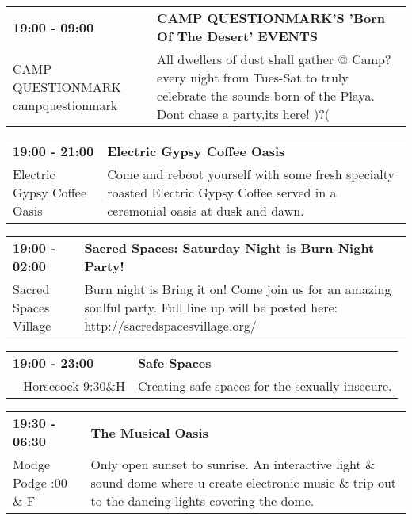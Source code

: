 \begin{tabular}{ p{1in} p{2.2in} }
    \textbf{19:00 - 09:00} & \textbf{CAMP QUESTIONMARK'S 'Born Of The Desert' EVENTS  } \\
    CAMP QUESTIONMARK \newline campquestionmark & All dwellers of dust shall gather @ Camp? every night from Tues-Sat to truly celebrate the sounds born of the Playa. Dont chase a party,its here!
)?( \\
    \hline 
\end{tabular}
    
\begin{tabular}{ p{1in} p{2.2in} }
    \textbf{19:00 - 21:00} & \textbf{Electric Gypsy Coffee Oasis} \\
    Electric Gypsy Coffee Oasis \newline  & Come and reboot yourself with some fresh specialty roasted Electric Gypsy Coffee served in a ceremonial oasis at dusk and dawn. \\
    \hline 
\end{tabular}
    
\begin{tabular}{ p{1in} p{2.2in} }
    \textbf{19:00 - 02:00} & \textbf{Sacred Spaces: Saturday Night is Burn Night Party!} \\
    Sacred Spaces Village \newline  & Burn night is Bring it on! Come join us for an amazing soulful party. Full line up will be posted here: http://sacredspacesvillage.org/ \\
    \hline 
\end{tabular}
    
\begin{tabular}{ p{1in} p{2.2in} }
    \textbf{19:00 - 23:00} & \textbf{Safe Spaces} \\
    ~ \newline Horsecock 9:30\&H & Creating safe spaces for the sexually insecure. \\
    \hline 
\end{tabular}
    
\begin{tabular}{ p{1in} p{2.2in} }
    \textbf{19:30 - 06:30} & \textbf{The Musical Oasis} \\
    Modge Podge \newline 9:00 \& F & Only open sunset to sunrise.  An interactive light \& sound dome where u create electronic music \& trip out to the dancing lights covering the dome. \\
    \hline 
\end{tabular}
    
